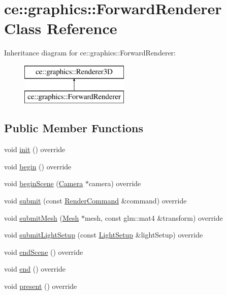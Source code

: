 \hypertarget{classce_1_1graphics_1_1_forward_renderer}{}\section{ce\+:\+:graphics\+:\+:Forward\+Renderer Class Reference}
\label{classce_1_1graphics_1_1_forward_renderer}
Inheritance diagram for ce\+:\+:graphics\+:\+:Forward\+Renderer\+:\begin{figure}[H]
\begin{center}
\leavevmode
\includegraphics[height=2.000000cm]{classce_1_1graphics_1_1_forward_renderer}
\end{center}
\end{figure}
\subsection*{Public Member Functions}
\begin{DoxyCompactItemize}
\item 
void \hyperlink{classce_1_1graphics_1_1_forward_renderer_ac6c7ad9a18ecfb2cbb6aee202e7e2e8f}{init} () override
\item 
void \hyperlink{classce_1_1graphics_1_1_forward_renderer_a4550120dc1349b5298de4a02422c6c26}{begin} () override
\item 
void \hyperlink{classce_1_1graphics_1_1_forward_renderer_ae84dbf0b5a71b464cf4fc34a5daac805}{begin\+Scene} (\hyperlink{classce_1_1graphics_1_1_camera}{Camera} $\ast$camera) override
\item 
void \hyperlink{classce_1_1graphics_1_1_forward_renderer_a3fb15f85368a78834b9d25b98461916c}{submit} (const \hyperlink{structce_1_1graphics_1_1_render_command}{Render\+Command} \&command) override
\item 
void \hyperlink{classce_1_1graphics_1_1_forward_renderer_abfb5f86e8b5c6a1824ab7a03838785fd}{submit\+Mesh} (\hyperlink{classce_1_1graphics_1_1_mesh}{Mesh} $\ast$mesh, const glm\+::mat4 \&transform) override
\item 
void \hyperlink{classce_1_1graphics_1_1_forward_renderer_a32c92d13c2ba951f71552ea9cf15350c}{submit\+Light\+Setup} (const \hyperlink{structce_1_1graphics_1_1_light_setup}{Light\+Setup} \&light\+Setup) override
\item 
void \hyperlink{classce_1_1graphics_1_1_forward_renderer_a34bf60e44a9a594ab596f46ca7688e3e}{end\+Scene} () override
\item 
void \hyperlink{classce_1_1graphics_1_1_forward_renderer_a8a8c16a645e63fd54b932f62d96d805b}{end} () override
\item 
void \hyperlink{classce_1_1graphics_1_1_forward_renderer_a19933a9015f2abbd27b398e7a6d697b6}{present} () override
\end{DoxyCompactItemize}
